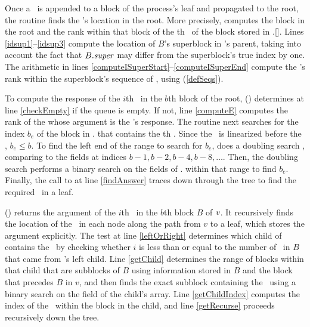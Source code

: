 Once a \dequeue\ is appended to a block of the process's leaf and propagated to the root,
the  routine finds the \dequeue's location in the root.
More precisely, 
computes the block in the root and the rank
within that block  of the th \dequeue\ of the block  stored in .[].
Lines \ref{idsup1}--\ref{idsup3} compute the location of $B$'s superblock in 's parent, taking into account the fact that $B.\mbox{\textit{super}}$ may differ from the superblock's true index by one.
The arithmetic in lines \ref{computeISuperStart}--\ref{computeISuperEnd} compute the \dequeue's 
rank within the superblock's sequence of \dequeues, using  (\ref{defSeqs}).

To compute the response of the $i$th \dequeue\ in the $b$th block
of the root, () determines at line \ref{checkEmpty} if the queue is empty.
If not, line \ref{computeE} computes the rank  of the
 whose argument is the \dequeue's response. 
The routine next searches for
the index $b_e$ of the block in . that contains 
the th \enqueue.
Since the \enqueue\ is linearized before the \dequeue, \linebreak $b_e\leq b$.  To find the left end of the range to search for $b_e$,  does a doubling search \cite{BY76}, comparing  to the  fields at indices $b-1, b-2, b-4, b-8, \ldots$.
Then, the doubling search performs a binary search on the  fields of . within that range to find $b_e$.
Finally, the call to  at line \ref{findAnswer} traces down through the tree to find the required \enqueue\ in a leaf.

() returns the argument of the
$i$th \enqueue\ in the $b$th block $B$ of  $\mbox{\textnormal{\textit{v}}}$. 
It recursively finds the location of the \enqueue\ in each node along the path from $v$ to a leaf, which stores the argument explicitly.
The test at line \ref{leftOrRight} determines which child of  contains
the \enqueue\ by checking whether $i$ is less than or equal to the number of  
\enqueues\ in $B$ that came from 's left child.
Line \ref{getChild} determines the range of blocks within that child that are subblocks of $B$
using information stored
in $B$ and the block that precedes $B$ in $v$,
and then
finds the exact subblock containing the \enqueue\ using a binary search on the 
field of the child's  array.
Line \ref{getChildIndex} computes the index of the \enqueue\ within the block
in the child, and line \ref{getRecurse}
proceeds recursively down the tree.



